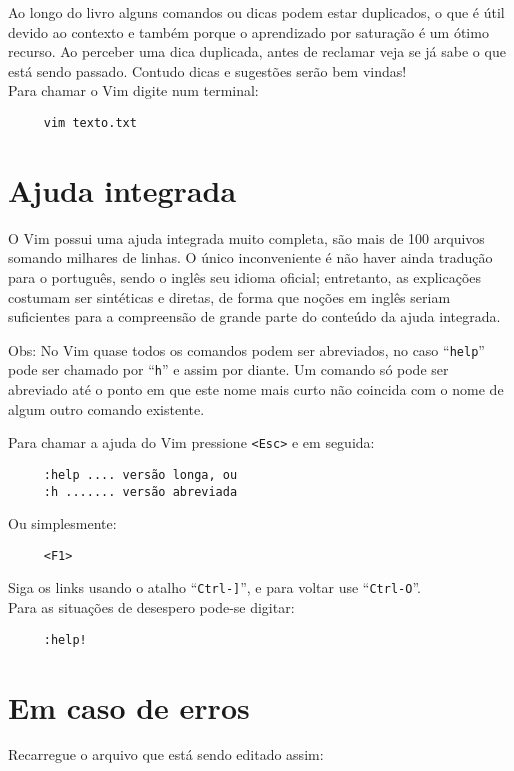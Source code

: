 Ao longo do livro alguns comandos ou dicas podem estar duplicados, o que
é útil devido ao contexto e também porque o aprendizado por saturação
é um ótimo recurso. Ao perceber uma dica duplicada, antes de
reclamar veja se já sabe o que está sendo passado. Contudo dicas e sugestões serão bem vindas! \\

Para chamar o Vim digite num terminal:

\begin{verbatim}
     vim texto.txt
\end{verbatim}

\section{Ajuda integrada}

O Vim possui uma ajuda integrada muito completa, são mais de 100 arquivos
somando milhares de linhas. O único inconveniente é não haver ainda tradução
para o português, sendo o inglês seu idioma oficial; entretanto, as explicações
costumam ser sintéticas e diretas, de forma que noções em inglês seriam
suficientes para a compreensão de grande parte do conteúdo da ajuda integrada.

Obs: No Vim quase todos os comandos podem ser abreviados, no caso
``\verb+help+'' pode ser chamado por ``\verb+h+'' e assim por diante. Um
comando só pode ser abreviado até o ponto em que este nome mais curto não
coincida com o nome de algum outro comando existente.

Para chamar a ajuda do Vim pressione \verb|<Esc>| e em seguida:

\begin{verbatim}
     :help .... versão longa, ou
     :h ....... versão abreviada
\end{verbatim}

Ou simplesmente:

\begin{verbatim}
     <F1>
\end{verbatim}

Siga os links usando o atalho ``\verb|Ctrl-]|'', e para voltar use
  ``\verb|Ctrl-O|''.\\

Para as situações de desespero pode-se digitar:

\begin{verbatim}
     :help!
\end{verbatim}

\section{Em caso de erros }\label{Em caso de erros }
Recarregue o arquivo que está sendo editado assim:

